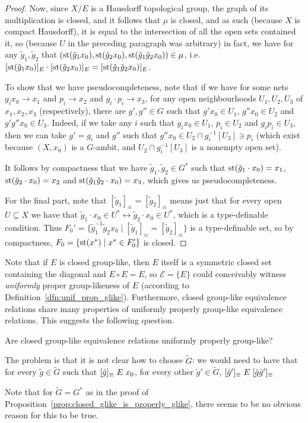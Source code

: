 \begin{proof}
		Now, since $X/E$ is a Hausdorff topological group, the graph of its multiplication is closed, and it follows that $\mu$ is closed, and as such (because $X$ is compact Hausdorff), it is equal to the intersection of all the open sets contained it, so (because $U$ in the preceding paragraph was arbitrary) in fact, we have for any $\tilde g_1,\tilde g_2$ that $(\operatorname{{st}}(\tilde g_1x_0),\operatorname{{st}}(\tilde g_2x_0),\operatorname{{st}}(\tilde g_1\tilde g_2x_0))\in \mu$, i.e.\ $[\operatorname{{st}}(\tilde g_1x_0)]_E\cdot [\operatorname{{st}}(\tilde g_2x_0)]_E=[\operatorname{{st}}(\tilde g_1\tilde g_2 x_0)]_E$.
		
		To show that we have pseudocompleteness, note that if we have for some nets $g_ix_0\to x_1$ and $p_i\to x_2$ and $g_i\cdot p_i\to x_3$, for any open neighbourhoods $U_1,U_2,U_3$ of $x_1,x_2,x_3$ (respectively), there are $g',g''\in G$ such that $g'x_0\in U_1$, $g''x_0\in U_2$ and $g'g''x_0\in U_3$. Indeed, if we take any $i$ such that $g_ix_0\in U_1$, $p_i\in U_2$ and $g_ip_i\in U_3$, then we can take $g'=g_i$ and $g''$ such that $g''x_0\in U_2\cap g_i^{-1}[U_3]\ni p_i$ (which exist because $(X,x_0)$ is a $G$-ambit, and $U_2\cap g_i^{-1}[U_3]$ is a nonempty open set).
		
		It follows by compactness that we have $\tilde g_1,\tilde g_2\in G^*$ such that $\operatorname{{st}}(\tilde g_1\cdot x_0)=x_1$, $\operatorname{{st}}(\tilde g_2\cdot x_0)=x_2$ and $\operatorname{{st}}(\tilde g_1\tilde g_2\cdot x_0)=x_3$, which gives us pseudocompleteness.
		
		For the final part, note that $[\tilde g_1]_\equiv=[\tilde g_2]_\equiv$ means just that for every open $U\subseteq X$ we have that $\tilde g_1\cdot x_0\in U^*\leftrightarrow \tilde g_2\cdot x_0\in U^*$, which is a type-definable condition. Thus $F_0'=\{ \tilde g_1^{-1}\tilde g_2x_0\mid [\tilde g_1]_\equiv=[\tilde g_2]_\equiv \}$ is a type-definable set, so by compactness, $F_0=\{\operatorname{{st}}(x^*)\mid x^*\in F_0' \}$ is closed.
	\end{proof}
	
	Note that if $E$ is closed group-like, then $E$ itself is a symmetric closed set containing the diagonal and $E\circ E=E$, so $\mathcal E=\{E\}$ could conceivably witness \emph{uniformly} proper group-likeness of $E$ (according to Definition~\ref{dfn:unif_prop_glike}). Furthermore, closed group-like equivalence relations share many properties of uniformly properly group-like equivalence relations. This suggests the following question.
	
	\begin{qu}
		\label{qu:clsd_gplike_upglike}
		Are closed group-like equivalence relations uniformly properly group-like?
	\end{qu}

	The problem is that it is not clear how to choose $\tilde G$: we would need to have that for every $\tilde g\in \tilde G$ such that $[\tilde g]_{\equiv}\mathrel{E} x_0$, for every other $\tilde g'\in \tilde G$, $[\tilde g']_{\equiv}\mathrel{E} [\tilde g\tilde g']_{\equiv}$
	
	Note that for $\tilde G=G^*$ as in the proof of Proposition~\ref{prop:closed_glike_is_properly_glike}, there seems to be no obvious reason for this to be true.
	
	
